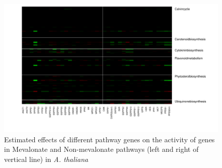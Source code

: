 \begin{figure}[t]
\begin{center}
\includegraphics[width=\textwidth]{cropped_gene_heatmap1}

\caption{Estimated effects of different pathway genes on the activity of genes in Mevalonate and Non-mevalonate pathways (left and right of vertical line) in \textit{A. thaliana}}
\label{fig:coeffplots}
\end{center}
\end{figure}
%

